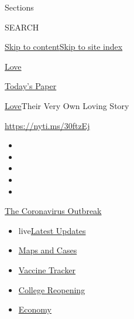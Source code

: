 Sections

SEARCH

\protect\hyperlink{site-content}{Skip to
content}\protect\hyperlink{site-index}{Skip to site index}

\href{https://www.nytimes.com/section/fashion/weddings}{Love}

\href{https://myaccount.nytimes.com/auth/login?response_type=cookie\&client_id=vi}{}

\href{https://www.nytimes.com/section/todayspaper}{Today's Paper}

\href{/section/fashion/weddings}{Love}\textbar{}Their Very Own Loving
Story

\url{https://nyti.ms/30ftzEj}

\begin{itemize}
\item
\item
\item
\item
\item
\end{itemize}

\href{https://www.nytimes.com/news-event/coronavirus?action=click\&pgtype=Article\&state=default\&region=TOP_BANNER\&context=storylines_menu}{The
Coronavirus Outbreak}

\begin{itemize}
\tightlist
\item
  live\href{https://www.nytimes.com/2020/08/03/world/coronavirus-covid-19.html?action=click\&pgtype=Article\&state=default\&region=TOP_BANNER\&context=storylines_menu}{Latest
  Updates}
\item
  \href{https://www.nytimes.com/interactive/2020/us/coronavirus-us-cases.html?action=click\&pgtype=Article\&state=default\&region=TOP_BANNER\&context=storylines_menu}{Maps
  and Cases}
\item
  \href{https://www.nytimes.com/interactive/2020/science/coronavirus-vaccine-tracker.html?action=click\&pgtype=Article\&state=default\&region=TOP_BANNER\&context=storylines_menu}{Vaccine
  Tracker}
\item
  \href{https://www.nytimes.com/2020/08/02/us/covid-college-reopening.html?action=click\&pgtype=Article\&state=default\&region=TOP_BANNER\&context=storylines_menu}{College
  Reopening}
\item
  \href{https://www.nytimes.com/live/2020/08/03/business/stock-market-today-coronavirus?action=click\&pgtype=Article\&state=default\&region=TOP_BANNER\&context=storylines_menu}{Economy}
\end{itemize}

